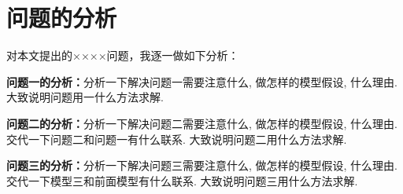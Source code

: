 \section{问题的分析}
对本文提出的××××问题，我逐一做如下分析：

\textbf{问题一的分析：}分析一下解决问题一需要注意什么, 做怎样的模型假设, 什么理由. 大致说明问题用一什么方法求解. 

\textbf{问题二的分析：}分析一下解决问题二需要注意什么, 做怎样的模型假设, 什么理由. 交代一下问题二和问题一有什么联系. 大致说明问题二用什么方法求解.

\textbf{问题三的分析：}分析一下解决问题三需要注意什么, 做怎样的模型假设, 什么理由. 交代一下模型三和前面模型有什么联系. 大致说明问题三用什么方法求解.

